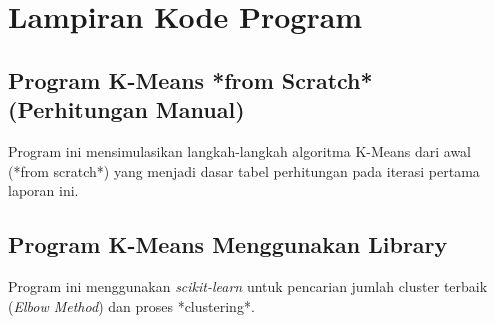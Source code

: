 \documentclass[12pt, a4paper]{article}
\begin{document}
\section{Lampiran Kode Program}

\subsection{Program K-Means *from Scratch* (Perhitungan Manual)}
Program ini mensimulasikan langkah-langkah algoritma K-Means dari awal (*from scratch*) yang menjadi dasar tabel perhitungan pada iterasi pertama laporan ini.



\subsection{Program K-Means Menggunakan Library}
Program ini menggunakan \textit{scikit-learn} untuk pencarian jumlah cluster terbaik (\textit{Elbow Method}) dan proses *clustering*.


\end{document}

